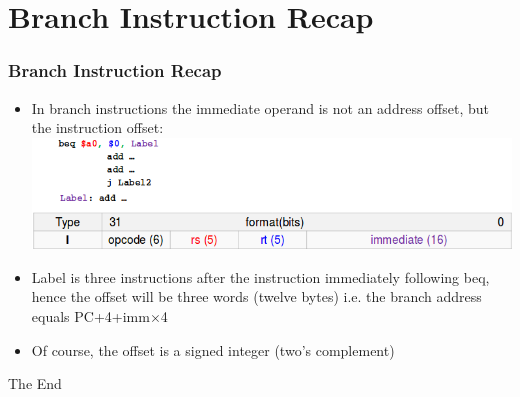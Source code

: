 \documentclass{beamer}
\begin{document}
\section{Branch Instruction Recap}
\begin{frame}
\frametitle{Branch Instruction Recap}
\begin{itemize}
\item In branch instructions the immediate operand is not an address offset, but the instruction offset:
\includegraphics[scale=0.4]{brec.png}
\item {\color{purple}Label} is three instructions after the instruction immediately following beq, hence the offset will be three words (twelve bytes) i.e. the branch address equals PC+4+imm$\times$4
\item Of course, the offset is a signed integer (two's complement)
\end{itemize}
\end{frame}

\begin{frame} 
\Huge{\centerline{The End}}
\end{frame}
\end{document}
